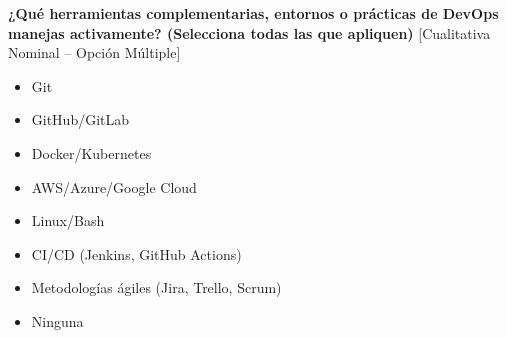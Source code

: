 \textbf{¿Qué herramientas complementarias, entornos o prácticas de DevOps manejas activamente? (Selecciona todas las que apliquen)} [Cualitativa Nominal -- Opción Múltiple]

\begin{itemize}
    \item Git
    \item GitHub/GitLab
    \item Docker/Kubernetes
    \item AWS/Azure/Google Cloud
    \item Linux/Bash
    \item CI/CD (Jenkins, GitHub Actions)
    \item Metodologías ágiles (Jira, Trello, Scrum)
    \item Ninguna
\end{itemize}